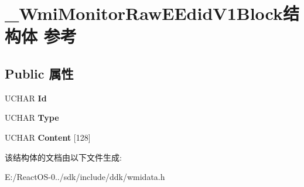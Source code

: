 \hypertarget{struct___wmi_monitor_raw_e_edid_v1_block}{}\section{\+\_\+\+Wmi\+Monitor\+Raw\+E\+Edid\+V1\+Block结构体 参考}
\label{struct___wmi_monitor_raw_e_edid_v1_block}
\subsection*{Public 属性}
\begin{DoxyCompactItemize}
\item 
\mbox{\label{struct___wmi_monitor_raw_e_edid_v1_block_aad3fae14a008fbd60e2cbdc1e8c62e19}} 
U\+C\+H\+AR {\bfseries Id}
\item 
\mbox{\label{struct___wmi_monitor_raw_e_edid_v1_block_a702847ba84b1e6ea77e03e15aebd5d86}} 
U\+C\+H\+AR {\bfseries Type}
\item 
\mbox{\label{struct___wmi_monitor_raw_e_edid_v1_block_ad5e465c521599e87b65b02c3988efc9a}} 
U\+C\+H\+AR {\bfseries Content} \mbox{[}128\mbox{]}
\end{DoxyCompactItemize}


该结构体的文档由以下文件生成\+:\begin{DoxyCompactItemize}
\item 
E\+:/\+React\+O\+S-\/0../sdk/include/ddk/wmidata.\+h\end{DoxyCompactItemize}
